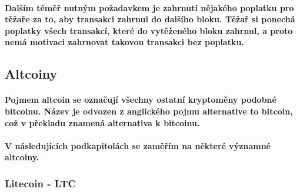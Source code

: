 \documentclass[thesis=B,czech]{FITthesis}[2019/03/21]
\begin{document}
\paragraph{
Dalším téměř nutným požadavkem je zahrnutí nějakého poplatku pro těžaře za to, aby transakci zahrnul do dalšího bloku. Těžař si ponechá poplatky všech transakcí, které do vytěženého bloku zahrnul, a proto nemá motivaci zahrnovat takovou transakci bez poplatku. \cite{Finex_blockchain}
}


\subsection{Altcoiny}
\paragraph{
Pojmem altcoin se označují všechny ostatní kryptoměny podobné bitcoinu. Název je odvozen z anglického pojmu alternative to bitcoin, což v překladu znamená alternativa k bitcoinu. \cite{altcoin}
}
\paragraph{
V následujících podkapitolách se zaměřím na některé významné altcoiny.
}
\subsubsection{Litecoin - LTC}
\end{document}
